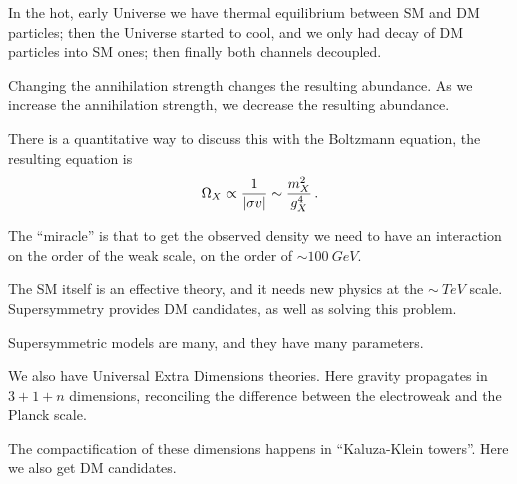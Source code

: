 \documentclass[main.tex]{subfiles}
\begin{document}
In the hot, early Universe we have thermal equilibrium between SM and DM particles;
then the Universe started to cool, and we only had decay of DM particles into SM ones;
then finally both channels decoupled. 

Changing the annihilation strength changes the resulting abundance. 
As we increase the annihilation strength, we decrease the resulting abundance.

There is a quantitative way to discuss this with the Boltzmann equation, the 
resulting equation is 
%
\begin{align}
\Omega_X \propto \frac{1}{\abs{\sigma v}} \sim \frac{m_X^2}{g_X^{4}}
\,.
\end{align}

The ``miracle'' is that to get the observed density we need 
to have an interaction on the order of the weak scale, on the order of 
\(\sim \SI{100}{GeV}\). 

The SM itself is an effective theory, and it needs new physics 
at the \(\sim \SI{}{TeV}\) scale. 
Supersymmetry provides DM candidates, as well as solving this problem. 

Supersymmetric models are many, and they have many parameters. 

We also have Universal Extra Dimensions theories. 
Here gravity propagates in \(3+1+n\) dimensions, reconciling
the difference between the electroweak and the Planck scale. 

The compactification of these dimensions happens in ``Kaluza-Klein towers''.
Here we also get DM candidates.
\end{document}
